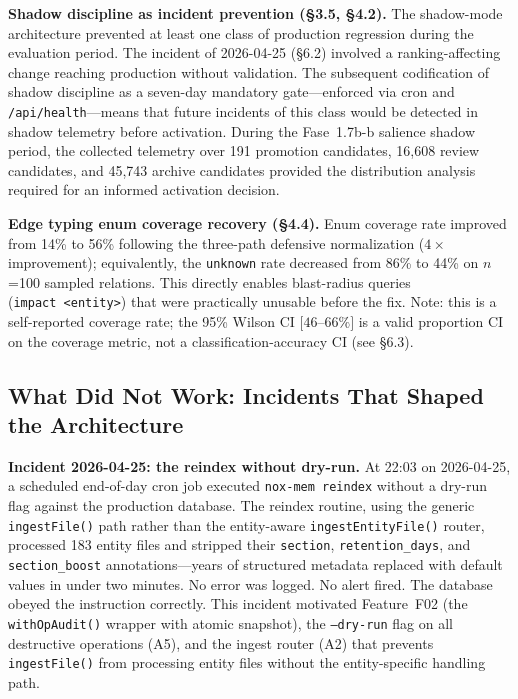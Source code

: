 \textbf{Shadow discipline as incident prevention (\S3.5, \S4.2).} The shadow-mode
architecture prevented at least one class of production regression during the evaluation
period. The incident of 2026-04-25 (\S6.2) involved a ranking-affecting change reaching
production without validation. The subsequent codification of shadow discipline as a
seven-day mandatory gate---enforced via cron and \texttt{/api/health}---means that future
incidents of this class would be detected in shadow telemetry before activation. During the
Fase~1.7b-b salience shadow period, the collected telemetry over 191 promotion candidates,
16,608 review candidates, and 45,743 archive candidates provided the distribution analysis
required for an informed activation decision.

\textbf{Edge typing enum coverage recovery (\S4.4).} Enum coverage rate improved from
14\% to 56\% following the three-path defensive normalization ($4\times$ improvement);
equivalently, the \texttt{unknown} rate decreased from 86\% to 44\% on $n$=100 sampled
relations. This directly enables blast-radius queries
(\texttt{impact~\textless entity\textgreater}) that were practically unusable before the
fix. Note: this is a self-reported coverage rate; the 95\% Wilson CI $[46$--$66\%]$ is a
valid proportion CI on the coverage metric, not a classification-accuracy CI (see \S6.3).

\subsection{What Did Not Work: Incidents That Shaped the Architecture}

\textbf{Incident 2026-04-25: the reindex without dry-run.} At 22:03 on 2026-04-25, a
scheduled end-of-day cron job executed \texttt{nox-mem reindex} without a dry-run flag
against the production database. The reindex routine, using the generic
\texttt{ingestFile()} path rather than the entity-aware \texttt{ingestEntityFile()} router,
processed 183 entity files and stripped their \texttt{section}, \texttt{retention\_days},
and \texttt{section\_boost} annotations---years of structured metadata replaced with default
values in under two minutes. No error was logged. No alert fired. The database obeyed the
instruction correctly. This incident motivated Feature~F02 (the \texttt{withOpAudit()}
wrapper with atomic snapshot), the \texttt{--dry-run} flag on all destructive operations
(A5), and the ingest router (A2) that prevents \texttt{ingestFile()} from processing entity
files without the entity-specific handling path.

